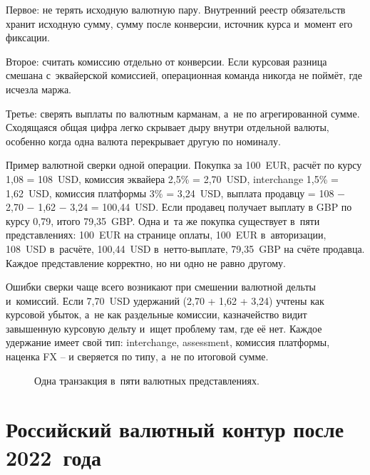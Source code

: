 Первое: не терять исходную валютную пару. Внутренний реестр
обязательств хранит исходную сумму, сумму после конверсии,
источник курса и~момент его фиксации.

Второе: считать комиссию отдельно от конверсии. Если курсовая
разница смешана с~эквайерской комиссией, операционная команда
никогда не поймёт, где исчезла маржа.

Третье: сверять выплаты по валютным карманам, а~не по
агрегированной сумме. Сходящаяся общая цифра легко скрывает
дыру внутри отдельной валюты, особенно когда одна валюта
перекрывает другую по номиналу.

Пример валютной сверки одной операции. Покупка за 100~EUR,
расчёт по курсу 1,08 = 108~USD, комиссия эквайера
2,5\% = 2,70~USD, interchange 1,5\% = 1,62~USD, комиссия
платформы 3\% = 3,24~USD, выплата продавцу =
108 $-$ 2,70 $-$ 1,62 $-$ 3,24 = 100,44~USD. Если продавец
получает выплату в GBP по курсу 0,79, итого 79,35~GBP. Одна
и~та же покупка существует в~пяти представлениях: 100~EUR на
странице оплаты, 100~EUR в~авторизации, 108~USD в~расчёте,
100,44~USD в~нетто-выплате, 79,35~GBP на счёте продавца.
Каждое представление корректно, но ни одно не равно другому.

Ошибки сверки чаще всего возникают при смешении валютной
дельты и~комиссий. Если 7,70~USD удержаний
(2,70 + 1,62 + 3,24) учтены как курсовой убыток, а~не как
раздельные комиссии, казначейство видит завышенную курсовую
дельту и~ищет проблему там, где её нет. Каждое удержание
имеет свой тип: interchange, assessment, комиссия платформы,
наценка FX -- и сверяется по типу, а~не по итоговой сумме.

\begin{figure}[tbp]
  \centering
  \caption{Одна транзакция в~пяти валютных представлениях.}\label{fig:multicurrency-recon}
\end{figure}

\section{Российский валютный контур после 2022~года}\label{sec:mc-russia}

